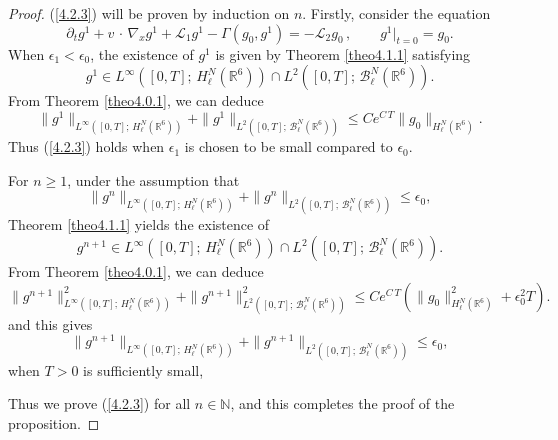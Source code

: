 \documentclass{amsart}[12pt, article]
\begin{document}
\begin{proof}

(\ref{4.2.3}) will be proven by induction on $n$. Firstly, consider the equation
\begin{equation*}
\partial_t g^{1} + v\,\cdot\,\nabla_x g^{1} + {{\mathcal L}}_1 g^{1}
- \Gamma (g_0 , g^{1})=-{{\mathcal L}}_2 g_0\,,\qquad g^{1}|_{t=0}=g_0.
\end{equation*}
When $\epsilon_1<\epsilon_0$, the existence of $g^1$ is given by Theorem \ref{theo4.1.1} satisfying
$$
g^1\in L^\infty([0, T];\, H^N_\ell({{{\mathbb R}}}^6))\cap L^2([0, T];\,
{{\mathcal B}}^N_\ell({{{\mathbb R}}}^6)).
$$
{}From Theorem \ref{theo4.0.1}, we can deduce
$$
\|g^1\|_{L^\infty([0, T];\, H^N_\ell({{{\mathbb R}}}^6))}+\|g^1\|_{L^2([0, T];\,
{{\mathcal B}}^N_\ell({{{\mathbb R}}}^6))}\leq  Ce^{C \, T} \|g_0\|_{H^N_\ell({{{\mathbb R}}}^6)}.
$$
Thus (\ref{4.2.3}) holds when $\epsilon_1$
is chosen to be small compared to $\epsilon_0$.

For $n\ge 1$,
under the assumption  that
$$
\|g^n\|_{L^\infty([0, T];\, H^N_\ell({{{\mathbb R}}}^6))}+\|g^n\|_{L^2([0, T];\,
{{\mathcal B}}^N_\ell({{{\mathbb R}}}^6))}\leq \epsilon_0,
$$
Theorem \ref{theo4.1.1} yields the existence of
$$
g^{n+1}\in L^\infty([0, T];\, H^N_\ell({{{\mathbb R}}}^6))\cap L^2([0, T];\,
{{\mathcal B}}^N_\ell({{{\mathbb R}}}^6)).
$$
{}From Theorem \ref{theo4.0.1}, we can deduce
$$
\|g^{n+1}\|^2_{L^\infty([0, T];\,
H^N_\ell({{{\mathbb R}}}^6))}+\|g^{n+1}\|^2_{L^2([0, T];\, {{\mathcal B}}^N_\ell({{{\mathbb R}}}^6))}\leq
Ce^{C\, T} (\|g_0\|^2_{H^N_\ell({{{\mathbb R}}}^6)} +\epsilon_0^2 T).
$$
and this gives
$$
\|g^{n+1}\|_{L^\infty([0, T];\,
H^N_\ell({{{\mathbb R}}}^6))}+\|g^{n+1}\|_{L^2([0, T];\, {{\mathcal B}}^N_\ell({{{\mathbb R}}}^6))}\leq \epsilon_0,
$$
when $ T>0$ is sufficiently small,

Thus we  prove (\ref{4.2.3}) for all $n\in{{\mathbb N}}$, and this completes
the proof of the proposition.
\end{proof}
\end{document}
